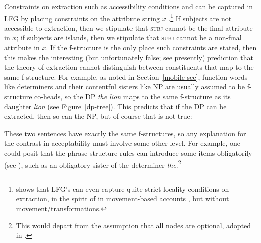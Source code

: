 \begin{sloppypar} 
Constraints on extraction such as accessibility conditions and   can be captured in LFG by placing constraints on the attribute string \ensuremath{x} \citep[Chapter~17]{dalrymple;ea19}.\footnote{\citet{asudeh-lpr} shows that LFG's  \citep[225--230]{dalrymple;ea19} can even capture quite strict locality conditions on extraction, in the spirit of  in movement-based accounts \citep{Chomsky73a,Chomsky77a-u}, but without movement/transformations.} If subjects are not accessible to extraction, then we stipulate that \textsc{subj} cannot be the final attribute in \ensuremath{x}; if subjects are islands, then we stipulate that \textsc{subj} cannot be a non-final attribute in \ensuremath{x}.  If the f-structure is the only place such constraints are stated, then 
this makes the interesting (but unfortunately false; see presently) prediction that the theory of extraction cannot distinguish between constituents that map to the same f-structure.  For example, as noted in Section~\ref{mobile-sec}, function words like determiners and their contentful sisters like NP are usually assumed to be f-structure co-heads, so the DP \textit{the lion} maps to the same f-structure as its daughter \textit{lion} (see  Figure~\ref{dp-tree}).  This predicts that if the DP can be extracted, then so can the NP, but of course that is not true:
\end{sloppypar}

\begin{exe} 
\ex	\label{nope}
\begin{xlist}
\end{xlist}
\end{exe}
These two sentences have exactly the same f-structures, so any explanation for the contrast in acceptability must involve some other level.  For example, one could posit that the phrase structure rules can introduce some items obligatorily (see \citealt[239]{snijders15}), such as an obligatory sister of the determiner \textit{the}.\footnote{This would depart from the assumption that all nodes are optional, adopted in \citet{BATW2016a}.} 


%

